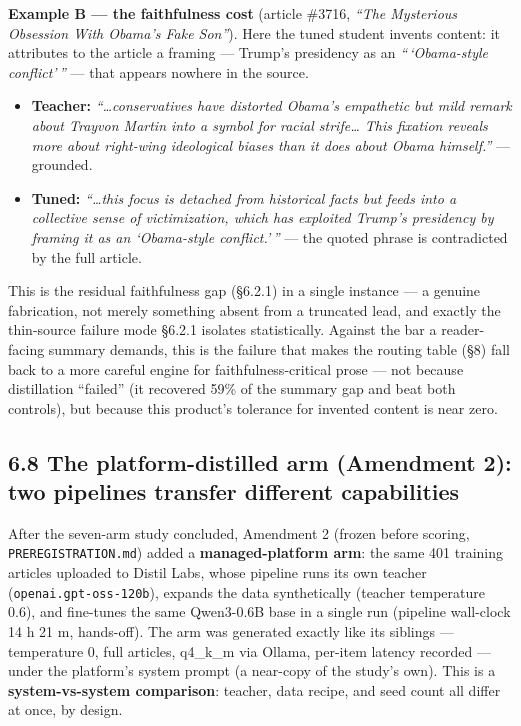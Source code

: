 \documentclass[11pt]{article}
\providecommand{\tightlist}{\setlength{\itemsep}{0pt}\setlength{\parskip}{0pt}}
\providecommand{\tightlist}{%
  \setlength{\itemsep}{0pt}\setlength{\parskip}{0pt}}
\begin{document}
\textbf{Example B --- the faithfulness cost} (article \#3716,
\emph{``The Mysterious Obsession With Obama's Fake Son''}). Here the
tuned student invents content: it attributes to the article a framing
--- Trump's presidency as an \emph{``\,`Obama-style conflict'\,''} ---
that appears nowhere in the source.

\begin{itemize}
\tightlist
\item
  \textbf{Teacher:} \emph{``\ldots conservatives have distorted Obama's
  empathetic but mild remark about Trayvon Martin into a symbol for
  racial strife\ldots{} This fixation reveals more about right-wing
  ideological biases than it does about Obama himself.''} --- grounded.
\item
  \textbf{Tuned:} \emph{``\ldots this focus is detached from historical
  facts but feeds into a collective sense of victimization, which has
  exploited Trump's presidency by framing it as an `Obama-style
  conflict.'\,''} --- the quoted phrase is contradicted by the full
  article.
\end{itemize}

This is the residual faithfulness gap (§6.2.1) in a single instance ---
a genuine fabrication, not merely something absent from a truncated
lead, and exactly the thin-source failure mode §6.2.1 isolates
statistically. Against the bar a reader-facing summary demands, this is
the failure that makes the routing table (§8) fall back to a more
careful engine for faithfulness-critical prose --- not because
distillation ``failed'' (it recovered 59\% of the summary gap and beat
both controls), but because this product's tolerance for invented
content is near zero.

\subsection{6.8 The platform-distilled arm (Amendment 2): two pipelines
transfer different
capabilities}\label{the-platform-distilled-arm-amendment-2-two-pipelines-transfer-different-capabilities}

After the seven-arm study concluded, Amendment 2 (frozen before scoring,
\texttt{PREREGISTRATION.md}) added a \textbf{managed-platform arm}: the
same 401 training articles uploaded to Distil Labs, whose pipeline runs
its own teacher (\texttt{openai.gpt-oss-120b}), expands the data
synthetically (teacher temperature 0.6), and fine-tunes the same
Qwen3-0.6B base in a single run (pipeline wall-clock 14 h 21 m,
hands-off). The arm was generated exactly like its siblings ---
temperature 0, full articles, q4\_k\_m via Ollama, per-item latency
recorded --- under the platform's system prompt (a near-copy of the
study's own). This is a \textbf{system-vs-system comparison}: teacher,
data recipe, and seed count all differ at once, by design.
\end{document}
